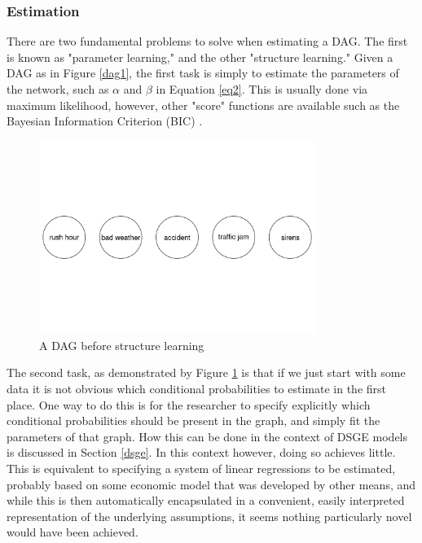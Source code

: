 \documentclass{article}
\begin{document}
\subsubsection{Estimation} \label{estimation}

There are two fundamental problems to solve when estimating a DAG. The first is known as "parameter learning," and the other "structure learning." Given a DAG as in Figure \ref{dag1}, the first task is simply to estimate the parameters of the network, such as $\alpha$ and $\beta$ in Equation \ref{eq2}. This is usually done via maximum likelihood, however, other "score" functions are available such as the Bayesian Information Criterion (BIC) \parencite{chen1998speaker}.

\begin{figure}
  \centering
  \includegraphics[width=0.8\textwidth]{images/trafficjam_unfit.png}
  \caption{A DAG before structure learning}
  \label{dag2}
\end{figure}

The second task, as demonstrated by Figure \ref{dag2} is that if we just start with some data it is not obvious which conditional probabilities to estimate in the first place. One way to do this is for the researcher to specify explicitly which conditional probabilities should be present in the graph, and simply fit the parameters of that graph. How this can be done in the context of DSGE models is discussed in Section \ref{dsge}. In this context however, doing so achieves little. This is equivalent to specifying a system of linear regressions to be estimated, probably based on some economic model that was developed by other means, and while this is then automatically encapsulated in a convenient, easily interpreted representation of the underlying assumptions, it seems nothing particularly novel would have been achieved. 
\end{document}
